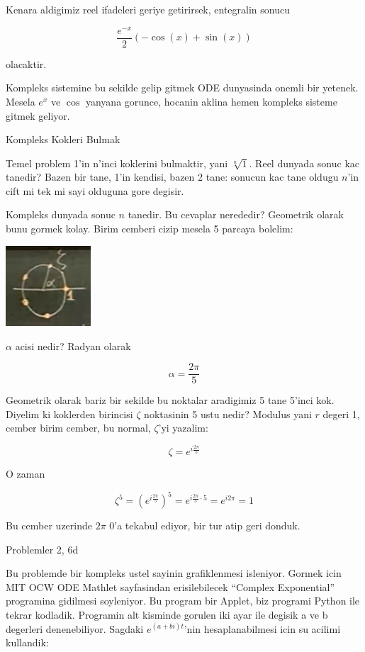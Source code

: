 \documentclass[12pt,fleqn]{article}\usepackage{../common}
\begin{document}
Kenara aldigimiz reel ifadeleri geriye getirirsek, entegralin sonucu

\[ \frac{e^{-x}}{2}(-\cos(x) + \sin(x)) \]

olacaktir. 

Kompleks sistemine bu sekilde gelip gitmek ODE dunyasinda onemli bir
yetenek. Mesela $e^{x}$ ve $\cos$ yanyana gorunce, hocanin aklina hemen
kompleks sisteme gitmek geliyor. 

Kompleks Kokleri Bulmak

Temel problem 1'in n'inci koklerini bulmaktir, yani $\sqrt[n]{1}$. Reel
dunyada sonuc kac tanedir? Bazen bir tane, 1'in kendisi, bazen 2 tane:
sonucun kac tane oldugu $n$'in cift mi tek mi sayi olduguna gore degisir.

Kompleks dunyada sonuc $n$ tanedir. Bu cevaplar nerededir? Geometrik olarak
bunu gormek kolay. Birim cemberi cizip mesela 5 parcaya bolelim:

\includegraphics[height=3cm]{6_5.png}

$\alpha$ acisi nedir? Radyan olarak 

\[ \alpha = \frac{2\pi}{5} \]

Geometrik olarak bariz bir sekilde bu noktalar aradigimiz 5 tane 5'inci
kok. Diyelim ki koklerden birincisi $\zeta$ noktasinin 5 ustu nedir?
Modulus yani $r$ degeri 1, cember birim cember, bu normal, $\zeta$'yi yazalim:

\[ \zeta = e^{i\frac{2\pi}{5}} \]

O zaman

\[ 
\zeta^5 = (e^{i\frac{2\pi}{5}})^5 = e^{i\frac{2\pi}{5} \cdot 5} = e^{i2\pi} =
1 
\]

Bu cember uzerinde $2\pi$ 0'a tekabul ediyor, bir tur atip geri donduk. 

Problemler 2, 6d

Bu problemde bir kompleks ustel sayinin grafiklenmesi isleniyor. Gormek
icin MIT OCW ODE Mathlet sayfasindan erisilebilecek ``Complex Exponential''
programina gidilmesi soyleniyor. Bu program bir Applet, biz programi Python
ile tekrar kodladik. Programin alt kisminde gorulen iki ayar ile degisik a
ve b degerleri denenebiliyor. Sagdaki $e^{(a+bi)t}$'nin hesaplanabilmesi
icin su acilimi kullandik:
\end{document}
